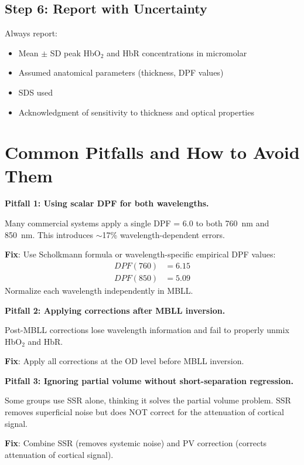 \documentclass[12pt]{article}
\def\text#1{#1}%
\begin{document}
\subsection{Step 6: Report with Uncertainty}

Always report:
\begin{itemize}
\item Mean $\pm$ SD peak HbO$_2$ and HbR concentrations in micromolar
\item Assumed anatomical parameters (thickness, DPF values)
\item SDS used
\item Acknowledgment of sensitivity to thickness and optical properties
\end{itemize}

\section{Common Pitfalls and How to Avoid Them}

\begin{caution}
\textbf{Pitfall 1: Using scalar DPF for both wavelengths.}

Many commercial systems apply a single DPF = 6.0 to both 760~nm and 850~nm. This introduces $\sim$17\% wavelength-dependent errors.

\textbf{Fix}: Use Scholkmann formula or wavelength-specific empirical DPF values:
\begin{align}
\text{DPF}(760) &= 6.15 \\
\text{DPF}(850) &= 5.09
\end{align}
Normalize each wavelength independently in MBLL.
\end{caution}

\begin{caution}
\textbf{Pitfall 2: Applying corrections after MBLL inversion.}

Post-MBLL corrections lose wavelength information and fail to properly unmix HbO$_2$ and HbR.

\textbf{Fix}: Apply all corrections at the OD level before MBLL inversion.
\end{caution}

\begin{caution}
\textbf{Pitfall 3: Ignoring partial volume without short-separation regression.}

Some groups use SSR alone, thinking it solves the partial volume problem. SSR removes superficial noise but does NOT correct for the attenuation of cortical signal.

\textbf{Fix}: Combine SSR (removes systemic noise) and PV correction (corrects attenuation of cortical signal).
\end{caution}
\end{document}
